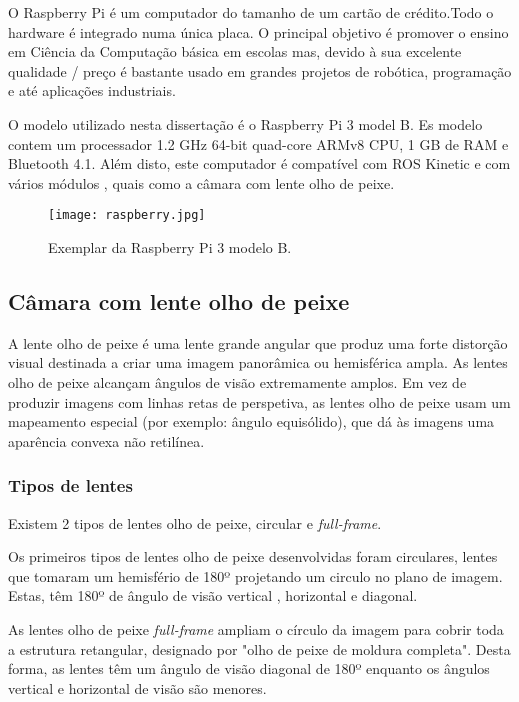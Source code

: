 O Raspberry Pi é um computador do tamanho de um cartão de crédito.Todo o hardware é integrado numa única placa. O principal objetivo é promover o ensino em Ciência da Computação básica em escolas mas, devido à sua excelente qualidade / preço é bastante usado em grandes projetos de robótica, programação e até aplicações industriais. 

O modelo utilizado nesta dissertação é o Raspberry Pi 3 model B. Es modelo contem um processador 1.2 GHz 64-bit quad-core ARMv8 CPU, 1 GB de RAM e Bluetooth 4.1. Além disto, este computador é compatível com ROS Kinetic e com vários módulos , quais como a câmara com lente olho de peixe.

\begin{figure}[h!] %
	\begin{center}
		\leavevmode		
		\texttt{[image: raspberry.jpg]}
		\caption{Exemplar da Raspberry Pi 3 modelo B.}
		\label{fig:raspberry}
	\end{center}
\end{figure}

\subsection{Câmara com lente olho de peixe}

A lente olho de peixe é uma lente grande angular que produz uma forte distorção visual destinada a criar uma imagem panorâmica ou hemisférica ampla. As lentes olho de peixe alcançam ângulos de visão extremamente amplos. Em vez de produzir imagens com linhas retas de perspetiva, as lentes olho de peixe usam um mapeamento especial (por exemplo: ângulo equisólido), que dá às imagens uma aparência convexa não retilínea.

\subsubsection{Tipos de lentes}

Existem 2 tipos de lentes olho de peixe, circular e \textit{full-frame}. 

Os primeiros tipos de lentes olho de peixe desenvolvidas foram circulares, lentes que tomaram um hemisfério de 180º projetando um circulo no plano de imagem. Estas, têm 180º de ângulo de visão vertical , horizontal e diagonal. 

As lentes olho de peixe \textit{full-frame} ampliam o círculo da imagem para cobrir toda a estrutura retangular, designado por "olho de peixe de moldura completa". Desta forma, as lentes têm um ângulo de visão diagonal de 180º enquanto os ângulos vertical e horizontal de visão são menores. 

